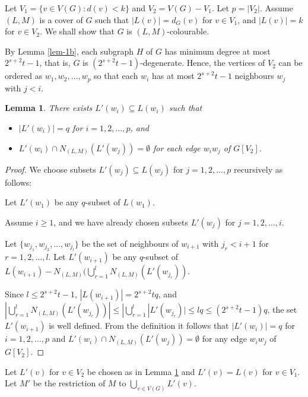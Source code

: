 \documentclass[11pt,a4paper]{article}
\newtheorem{lem}{Lemma}
\theoremstyle{definition}
\begin{document}
	 
		



Let $V_1 = \{v \in V(G): d(v) < k\}$ and $V_2 =V(G)-V_1$. 
Let $p=|V_2|$.  Assume $(L,M)$ is a cover of $G$ such that $|L(v)| = d_G(v)$ for $v \in V_1$, and $|L(v)|=k$ for $v \in V_2$.
We shall show that $G$ is $(L,M)$-colourable.  
 

	
		By Lemma \ref{lem-1b}, each subgraph $H$ of $G$ has minimum degree at most $2^{s+2}t-1$, that is, $G$ is $(2^{s+2}t-1)$-degenerate. 
  Hence, the vertices of $V_2$ can be ordered as 
  $w_1,w_2, \ldots, w_p$  so that each $w_i$ has at most $2^{s+2}t-1$ neighbours $w_j$ with $j < i$.


\begin{lem}
    \label{lem-sub}
    There exists $L'(w_i) \subseteq L(w_i)$ such that 
    \begin{itemize}
        \item $|L'(w_i)|=q$  for $i=1,2,\ldots, p$, and 
        \item $L'(w_i) \cap N_{(L,M)}(L'(w_j)) = \emptyset$ for each edge $w_iw_j$ of $G[V_2]$.
    \end{itemize}
\end{lem}
\begin{proof}
    We choose subsets $L'(w_j) \subseteq L(w_j)$ for $j=1,2,\ldots, p$ recursively as follows:
    
     Let $L'(w_1)$ be any $q$-subset of $L(w_1)$. 

    Assume $i \ge 1$, and we have already chosen subsets $L'(w_j)$ for $j=1,2,\ldots, i$.

    Let $\{w_{j_1}, w_{j_2}, \ldots, w_{j_l}\}$ be the set of neighbours  of $w_{i+1}$ with $j_r < i+1$ for $r=1,2,\ldots, l$. Let 
    $L'(w_{i+1}) $ be any $q$-subset of $L(w_{i+1}) - N_{(L,M)} (\bigcup_{r=1}^l N_{(L,M)} (L' (w_{j_r}))$.  
  
 
Since $l \le   2^{s+2}t-1$,  $|L(w_{i+1})|=2^{s+2}tq$, 
and $|\bigcup_{r=1}^l N_{(L,M)} (L' (w_{j_r}))| \le |\bigcup_{r=1}^l |L' (w_{j_r})| \le lq \le (2^{s+2}t-1)q$, the set $L'(w_{i+1}) $ is well defined. From the definition it follows that $|L'(w_i)|=q$ for $i=1,2,\ldots, p$ and $L'(w_i) \cap N_{(L,M)}(L'(w_j)) = \emptyset$ for any edge $w_iw_j$ of $G[V_2]$.
 \end{proof}

Let $L'(v)$ for $v \in V_2$ be chosen as in Lemma \ref{lem-sub} and $L'(v)=L(v)$ for $v \in V_1$. Let $M'$ be the restriction of
$M$ to $\bigcup_{v \in V(G)}L'(v)$.
\end{document}
